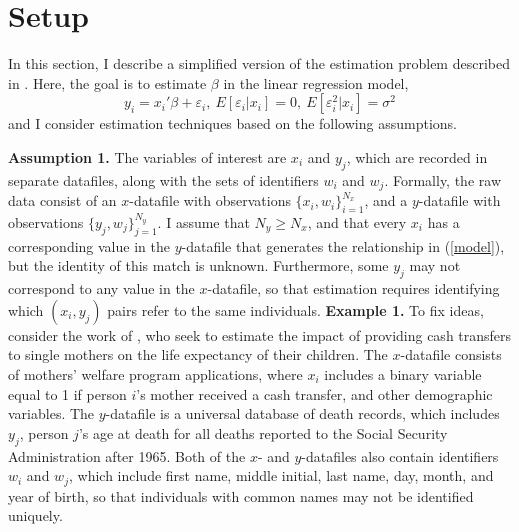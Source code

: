 \documentclass[12pt]{article}
\begin{document}


\section{Setup} 

In this section, I describe a simplified version of the estimation problem described in \citet*{ahl2019}.  Here, the goal is to estimate $\beta$ in the linear regression model, \begin{equation} y_i = x_i'\beta + \varepsilon_i, \ E[\varepsilon_i | x_i] = 0, \ E[\varepsilon_i^2 | x_i ] = \sigma^2  \label{model} \end{equation}
and I consider estimation techniques based on the following assumptions. 

\addlinespace
\textbf{Assumption 1.}  The variables of interest are $x_i$ and $y_j$, which are recorded in separate datafiles, along with the sets of identifiers $w_i$ and $w_j$.  Formally, the raw data consist of an $x$-datafile with observations $\{x_i, w_i\}_{i=1}^{N_x}$, and a $y$-datafile with observations $\{y_j, w_j\}_{j=1}^{N_y}$.   I assume that $N_y\geq N_x$, and that every $x_i$ has a corresponding value in the $y$-datafile that generates the relationship in (\ref{model}), but the identity of this match is unknown.  Furthermore, some $y_j$ may not correspond to any value in the $x$-datafile, so that estimation requires identifying which $(x_i,y_j)$ pairs refer to the same individuals.
\addlinespace
\textbf{Example 1.}  To fix ideas, consider the work of \citet*{aizer2016}, who seek to estimate the impact of providing cash transfers to single mothers on the life expectancy of their children.  The $x$-datafile consists of mothers' welfare program applications, where $x_i$ includes a binary variable equal to 1 if person $i$'s mother received a cash transfer, and other demographic variables.  The $y$-datafile is a universal database of death records, which includes $y_j$, person $j$'s age at death for all deaths reported to the Social Security Administration after 1965.  Both of the $x$- and $y$-datafiles also contain identifiers $w_i$ and $w_j$, which include first name, middle initial, last name, day, month, and year of birth, so that individuals with common names may not be identified uniquely. 
\addlinespace
\end{document}
